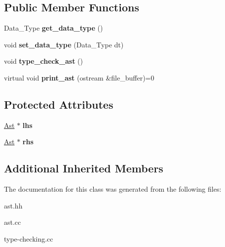 \subsection*{Public Member Functions}
\begin{DoxyCompactItemize}
\item 
\mbox{\label{classArithmetic__Expr__Ast_ad0ce7375a902b68a958cacda6fa3b4d5}} 
Data\+\_\+\+Type {\bfseries get\+\_\+data\+\_\+type} ()
\item 
\mbox{\label{classArithmetic__Expr__Ast_a591e5192e2f05b573d1c808015ca170b}} 
void {\bfseries set\+\_\+data\+\_\+type} (Data\+\_\+\+Type dt)
\item 
\mbox{\label{classArithmetic__Expr__Ast_ac05652b0220be526859bad95c6873df1}} 
void {\bfseries type\+\_\+check\+\_\+ast} ()
\item 
\mbox{\label{classArithmetic__Expr__Ast_ad3885866e66c45420689b6e469076b53}} 
virtual void {\bfseries print\+\_\+ast} (ostream \&file\+\_\+buffer)=0
\end{DoxyCompactItemize}
\subsection*{Protected Attributes}
\begin{DoxyCompactItemize}
\item 
\mbox{\label{classArithmetic__Expr__Ast_a1e86584c80d3bf1f1d778c86f3ab4b69}} 
\hyperlink{classAst}{Ast} $\ast$ {\bfseries lhs}
\item 
\mbox{\label{classArithmetic__Expr__Ast_afd3b364f7d4d7df60e33b8473102bb45}} 
\hyperlink{classAst}{Ast} $\ast$ {\bfseries rhs}
\end{DoxyCompactItemize}
\subsection*{Additional Inherited Members}


The documentation for this class was generated from the following files\+:\begin{DoxyCompactItemize}
\item 
ast.\+hh\item 
ast.\+cc\item 
type-\/checking.\+cc\end{DoxyCompactItemize}
